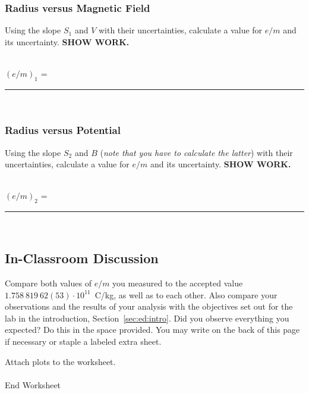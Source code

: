 \subsubsection{Radius versus Magnetic Field}
\noindent Using the slope $S_1$ and $V$ with their uncertainties, calculate a
value for $e/m$ and its uncertainty.  {\bf SHOW WORK.}\\ 
\vspace*{6cm}\\
\hspace*{2cm} {$(e/m)_1$ =~\rule{3cm}{.1mm}}\\ 

\subsubsection{Radius versus Potential}
\noindent Using the slope $S_2$ and $B$ ({\it note that you have to calculate 
the latter}) with their uncertainties, calculate a value for $e/m$ and its
uncertainty. {\bf SHOW WORK.}\\ 
\vspace*{6cm}\\
\hspace*{2cm} {$(e/m)_2$ =~\rule{3cm}{.1mm}}\\ 

\subsection{In-Classroom Discussion}
\noindent Compare both values of $e/m$ you measured to the accepted value
$1.758~819~62(53)\cdot 10^{11}$~C/kg, as well as to each other. Also compare
your observations and the results of your analysis with the objectives set out
for the lab in the introduction, Section~\ref{sec:ed:intro}. Did you observe 
everything you expected?  Do this in the space provided.  You may write on
the back of this page if necessary or staple a labeled extra sheet. 


\vfill
\noindent Attach plots to the worksheet. \\
\ \\
{\Large End Worksheet} 

\renewcommand{\thesection}{\thechapter.\arabic{section}}























